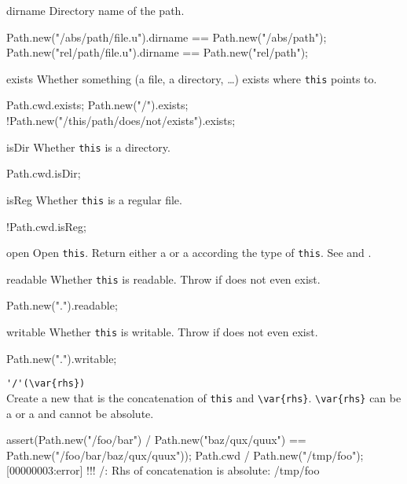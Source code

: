 \begin{urbiscriptapi}
\item[dirname]
  Directory name of the path.
\begin{urbiassert}
Path.new("/abs/path/file.u").dirname == Path.new("/abs/path");
Path.new("rel/path/file.u").dirname  == Path.new("rel/path");
\end{urbiassert}

\item[exists]
  Whether something (a file, a directory, \ldots) exists where
  \lstinline|this| points to.
\begin{urbiassert}
Path.cwd.exists;
Path.new("/").exists;
!Path.new("/this/path/does/not/exists").exists;
\end{urbiassert}

\item[isDir]
  Whether \lstinline|this| is a directory.
\begin{urbiassert}
Path.cwd.isDir;
\end{urbiassert}

\item[isReg]
  Whether \lstinline|this| is a regular file.
\begin{urbiassert}
!Path.cwd.isReg;
\end{urbiassert}

\item[open]
  Open \lstinline|this|. Return either a  or a
   according the type of \lstinline|this|. See
   and .

\item[readable]
  Whether \lstinline|this| is readable.  Throw if does not even exist.
\begin{urbiassert}
Path.new(".").readable;
\end{urbiassert}

\item[writable]
  Whether \lstinline|this| is writable.  Throw if does not even exist.
\begin{urbiassert}
Path.new(".").writable;
\end{urbiassert}

\item \lstinline|'/'(\var{rhs})|\\
  Create a new  that is the concatenation of
  \lstinline|this| and \lstinline|\var{rhs}|. \lstinline|\var{rhs}|
  can be a  or a  and cannot be absolute.
\begin{urbiscript}
assert(Path.new("/foo/bar") / Path.new("baz/qux/quux")
       == Path.new("/foo/bar/baz/qux/quux"));
Path.cwd / Path.new("/tmp/foo");
[00000003:error] !!! /: Rhs of concatenation is absolute: /tmp/foo
\end{urbiscript}


\end{urbiscriptapi}
